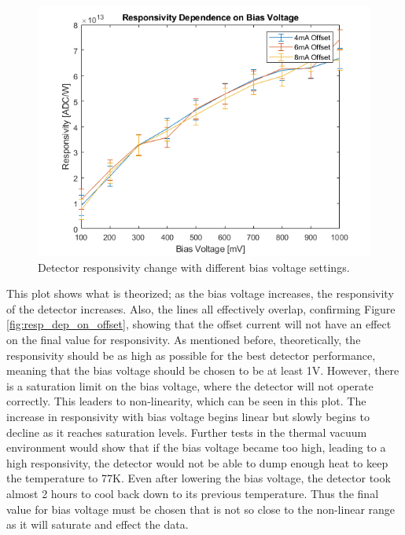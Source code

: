 \begin{figure}[h]
  \includegraphics[width=\linewidth]{chap6_images/verification/resp_dependence_on_bias.png}
  \caption{Detector responsivity change with different bias voltage settings.}
  \label{fig:resp_dep_on_bias}
\end{figure}

This plot shows what is theorized; as the bias voltage increases, the responsivity of the detector increases. Also, the lines all effectively overlap, confirming Figure \ref{fig:resp_dep_on_offset}, showing that the offset current will not have an effect on the final value for responsivity. As mentioned before, theoretically, the responsivity should be as high as possible for the best detector performance, meaning that the bias voltage should be chosen to be at least 1V. However, there is a saturation limit on the bias voltage, where the detector will not operate correctly. This leaders to non-linearity, which can be seen in this plot. The increase in responsivity with bias voltage begins linear but slowly begins to decline as it reaches saturation levels. Further tests in the thermal vacuum environment would show that if the bias voltage became too high, leading to a high responsivity, the detector would not be able to dump enough heat to keep the temperature to 77K. Even after lowering the bias voltage, the detector took almost 2 hours to cool back down to its previous temperature. Thus the final value for bias voltage must be chosen that is not so close to the non-linear range as it will saturate and effect the data.

